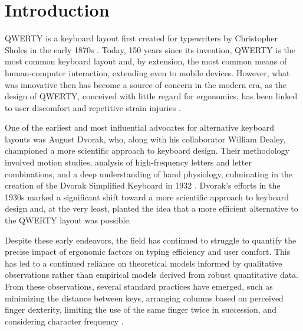 

\section{Introduction}
QWERTY is a keyboard layout first created for typewriters by Christopher Sholes in the early 1870s \citep{yasuoka2011prehistory}. Today, 150 years since its invention, QWERTY is the most common keyboard layout and, by extension, the most common means of human-computer interaction, extending even to mobile devices. However, what was innovative then has become a source of concern in the modern era, as the design of QWERTY, conceived with little regard for ergonomics, has been linked to user discomfort and repetitive strain injuries \citep{amell2000cumulative}.

One of the earliest and most influential advocates for alternative keyboard layouts was August Dvorak, who, along with his collaborator William Dealey, championed a more scientific approach to keyboard design. Their methodology involved motion studies, analysis of high-frequency letters and letter combinations, and a deep understanding of hand physiology, culminating in the creation of the Dvorak Simplified Keyboard in 1932 \citep{hiraga}. Dvorak's efforts in the 1930s marked a significant shift toward a more scientific approach to keyboard design and, at the very least, planted the idea that a more efficient alternative to the QWERTY layout was possible.

Despite these early endeavors, the field has continued to struggle to quantify the precise impact of ergonomic factors on typing efficiency and user comfort. This has led to a continued reliance on theoretical models informed by qualitative observations rather than empirical models derived from robust quantitative data. From these observations, several standard practices have emerged, such as minimizing the distance between keys, arranging columns based on perceived finger dexterity, limiting the use of the same finger twice in succession, and considering character frequency \citep{light1993typewriter}. %

